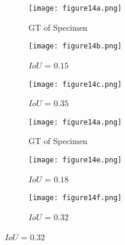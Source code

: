 \begin{figure} [!h]
	\centering
	\begin{subfigure}[b]{0.32\textwidth}
		\centering
		\texttt{[image: figure14a.png]}
		\caption{\centering GT of Specimen~}
		\label{fig:gt_specimen_2}
	\end{subfigure}
	\hfill
	\begin{subfigure}[b]{0.32\textwidth}
		\centering
		\texttt{[image: figure14b.png]}
		\caption{\centering \(IoU\) = \(0.15\)} 
		\label{fig:L3_S2_B_saeed}
	\end{subfigure}
	\hfill
	\begin{subfigure}[b]{0.32\textwidth}
		\centering
		\texttt{[image: figure14c.png]}
		\caption{\centering \(IoU\) = \(0.35\)} 
		\label{fig:L3_S2_B_ijjeh}
	\end{subfigure}
	\par\medskip
	\begin{subfigure}[b]{0.32\textwidth}
		\centering
		\texttt{[image: figure14a.png]}
		\caption{\centering GT of Specimen~}
		\label{fig:gt_specimen_3}
	\end{subfigure}
	\hfill
	\begin{subfigure}[b]{0.32\textwidth}
		\centering
		\texttt{[image: figure14e.png]}
		\caption{\centering \(IoU\) = \(0.18\)} 
		\label{fig:L3_S3_B_saeed}
	\end{subfigure}
	\hfill
	\begin{subfigure}[b]{0.32\textwidth}
		\centering
		\texttt{[image: figure14f.png]}
		\caption{\centering \(IoU\) = \(0.32\)} 

\end{subfigure}
\end{figure}

